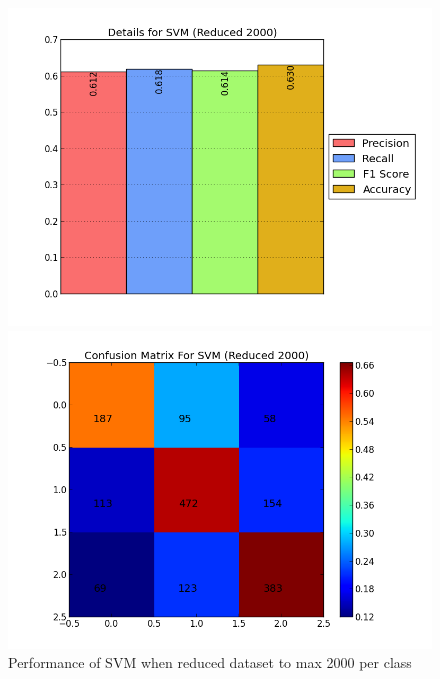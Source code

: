 \begin{figure}[htb]
	\centering
	\begin{minipage}{.45\linewidth}
		\includegraphics[width=\linewidth]{../img/plots/analysis/svm_stats_best_reduced_2000.png}
	\end{minipage}
	\hspace{0.05\linewidth}
	\begin{minipage}{.45\linewidth}
		\includegraphics[width=\linewidth]{../img/plots/analysis/svm_confusion_matrix_best_reduced_2000.png}
	\end{minipage}
	\caption[Performance of SVM when reduced dataset to max 2000 per class]{Performance of SVM when reduced dataset to max 2000 per class}
	\label{fig:svm_reduced_2000}
\end{figure}
